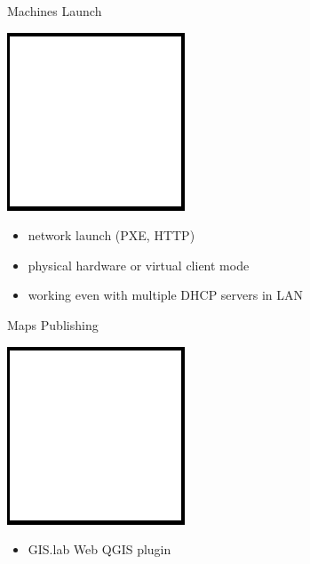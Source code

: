 \documentclass[12pt]{beamer}
\begin{document}
\begin{frame}{Machines Launch}
	\begin{center}
		\includegraphics[keepaspectratio=true,height=0.5\textheight]{images/image.png}
	\end{center}
	\begin{itemize}
		\item network launch (PXE, HTTP)
		\item physical hardware or virtual client mode
		\item working even with multiple DHCP servers in LAN
	\end{itemize}
\end{frame}

\begin{frame}{Maps Publishing}
	\begin{center}
		\includegraphics[keepaspectratio=true,height=0.5\textheight]{images/image.png}
	\end{center}
	\begin{itemize}
		\item GIS.lab Web QGIS plugin
	\end{itemize}
\end{frame}
\end{document}
